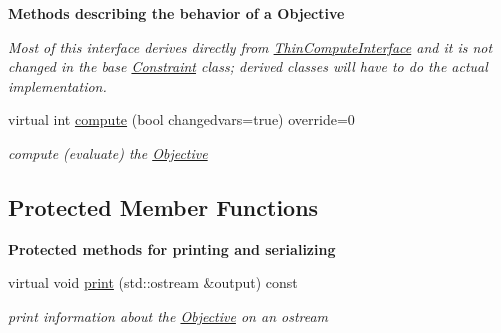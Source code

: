\begin{Indent}\textbf{ Methods describing the behavior of a Objective}\par
{\em Most of this interface derives directly from \mbox{\hyperlink{class_s_m_spp__di__unipi__it_1_1_thin_compute_interface}{Thin\+Compute\+Interface}} and it is not changed in the base \mbox{\hyperlink{class_s_m_spp__di__unipi__it_1_1_constraint}{Constraint}} class; derived classes will have to do the actual implementation. }\begin{DoxyCompactItemize}
\item 
virtual int \mbox{\hyperlink{class_s_m_spp__di__unipi__it_1_1_objective_a504d4e3e174c7a518cc66156a8a45ce5}{compute}} (bool changedvars=true) override=0
\begin{DoxyCompactList}\small\item\em compute (evaluate) the \mbox{\hyperlink{class_s_m_spp__di__unipi__it_1_1_objective}{Objective}} \end{DoxyCompactList}\end{DoxyCompactItemize}
\end{Indent}
\subsection*{Protected Member Functions}
\begin{Indent}\textbf{ Protected methods for printing and serializing}\par
\begin{DoxyCompactItemize}
\item 
virtual void \mbox{\hyperlink{class_s_m_spp__di__unipi__it_1_1_objective_a2e7b9c9148a98c5c342e8c25cac95926}{print}} (std\+::ostream \&output) const
\begin{DoxyCompactList}\small\item\em print information about the \mbox{\hyperlink{class_s_m_spp__di__unipi__it_1_1_objective}{Objective}} on an ostream \end{DoxyCompactList}\end{DoxyCompactItemize}
\end{Indent}
